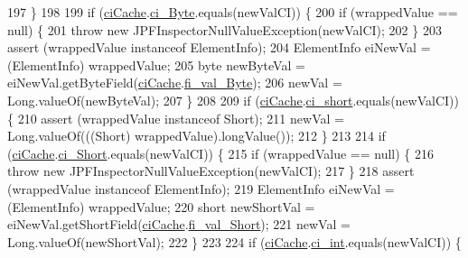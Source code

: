 \begin{DoxyCode}
197       \}
198 
199       \textcolor{keywordflow}{if} (\hyperlink{classgov_1_1nasa_1_1jpf_1_1inspector_1_1server_1_1programstate_1_1_state_value_a38182b5018580765f3f2cdc9e96e1ca2}{ciCache}.\hyperlink{classgov_1_1nasa_1_1jpf_1_1inspector_1_1utils_1_1_class_info_cache_a9f20df4baa3d028de1256ef61e82d7dc}{ci\_Byte}.equals(newValCI)) \{
200         \textcolor{keywordflow}{if} (wrappedValue == null) \{
201           \textcolor{keywordflow}{throw} \textcolor{keyword}{new} JPFInspectorNullValueException(newValCI);
202         \}
203         assert (wrappedValue instanceof ElementInfo);
204         ElementInfo eiNewVal = (ElementInfo) wrappedValue;
205         byte newByteVal = eiNewVal.getByteField(\hyperlink{classgov_1_1nasa_1_1jpf_1_1inspector_1_1server_1_1programstate_1_1_state_value_a38182b5018580765f3f2cdc9e96e1ca2}{ciCache}.\hyperlink{classgov_1_1nasa_1_1jpf_1_1inspector_1_1utils_1_1_class_info_cache_aad972468c8ee559186295e42e1b9f5de}{fi\_val\_Byte});
206         newVal = Long.valueOf(newByteVal);
207       \}
208 
209       \textcolor{keywordflow}{if} (\hyperlink{classgov_1_1nasa_1_1jpf_1_1inspector_1_1server_1_1programstate_1_1_state_value_a38182b5018580765f3f2cdc9e96e1ca2}{ciCache}.\hyperlink{classgov_1_1nasa_1_1jpf_1_1inspector_1_1utils_1_1_class_info_cache_aab8276cce884ee34fa1db91fc2d9bccf}{ci\_short}.equals(newValCI)) \{
210         assert (wrappedValue instanceof Short);
211         newVal = Long.valueOf(((Short) wrappedValue).longValue());
212       \}
213 
214       \textcolor{keywordflow}{if} (\hyperlink{classgov_1_1nasa_1_1jpf_1_1inspector_1_1server_1_1programstate_1_1_state_value_a38182b5018580765f3f2cdc9e96e1ca2}{ciCache}.\hyperlink{classgov_1_1nasa_1_1jpf_1_1inspector_1_1utils_1_1_class_info_cache_ab263ad66c64d7712f1835cb8e4914171}{ci\_Short}.equals(newValCI)) \{
215         \textcolor{keywordflow}{if} (wrappedValue == null) \{
216           \textcolor{keywordflow}{throw} \textcolor{keyword}{new} JPFInspectorNullValueException(newValCI);
217         \}
218         assert (wrappedValue instanceof ElementInfo);
219         ElementInfo eiNewVal = (ElementInfo) wrappedValue;
220         \textcolor{keywordtype}{short} newShortVal = eiNewVal.getShortField(\hyperlink{classgov_1_1nasa_1_1jpf_1_1inspector_1_1server_1_1programstate_1_1_state_value_a38182b5018580765f3f2cdc9e96e1ca2}{ciCache}.\hyperlink{classgov_1_1nasa_1_1jpf_1_1inspector_1_1utils_1_1_class_info_cache_afc6220bf5fcb698600f2865239641fab}{fi\_val\_Short});
221         newVal = Long.valueOf(newShortVal);
222       \}
223 
224       \textcolor{keywordflow}{if} (\hyperlink{classgov_1_1nasa_1_1jpf_1_1inspector_1_1server_1_1programstate_1_1_state_value_a38182b5018580765f3f2cdc9e96e1ca2}{ciCache}.\hyperlink{classgov_1_1nasa_1_1jpf_1_1inspector_1_1utils_1_1_class_info_cache_ae1f0dede5e0ce0e7e65305520ccc4814}{ci\_int}.equals(newValCI)) \{

\end{DoxyCode}
